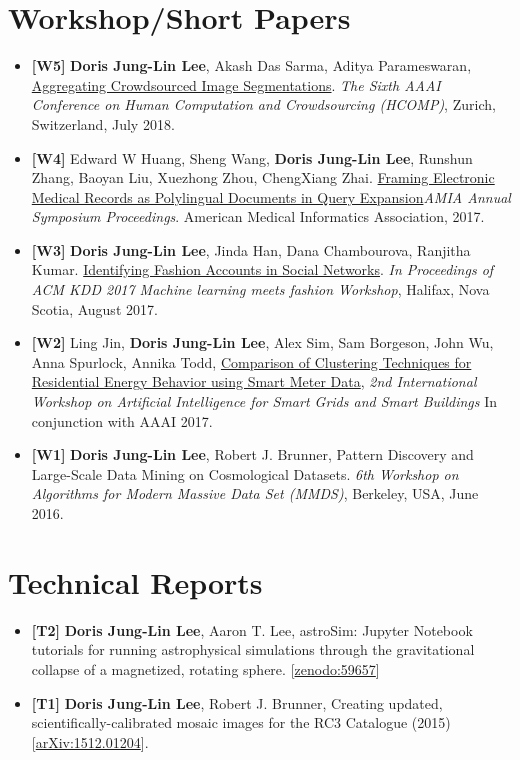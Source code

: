 \documentclass{res}
\begin{document}
\begin{resume}
\section{Workshop/Short Papers}
\begin{itemize}[leftmargin=0in,label={}]
\item \textbf{[W5]} \textbf{Doris Jung-Lin Lee}, Akash Das Sarma, Aditya Parameswaran, \href{http://ceur-ws.org/Vol-2173/paper10.pdf}{Aggregating Crowdsourced Image Segmentations}. \textit{The Sixth AAAI Conference on Human Computation and Crowdsourcing (HCOMP)}, Zurich, Switzerland, July 2018.
\item \textbf{[W4]} Edward W Huang, Sheng Wang, \textbf{Doris Jung-Lin Lee}, Runshun Zhang, Baoyan Liu, Xuezhong Zhou, ChengXiang Zhai. \href{https://amia2017.zerista.com/event/member/389402}{Framing Electronic Medical Records as Polylingual Documents in Query Expansion}\textit{AMIA Annual Symposium Proceedings}. American Medical Informatics Association, 2017.
\item \textbf{[W3]} \textbf{Doris Jung-Lin Lee}, Jinda Han, Dana Chambourova, Ranjitha Kumar. \href{https://kddfashion2017.mybluemix.net/final_submissions/ML4Fashion_paper_21.pdf}{Identifying Fashion Accounts in Social Networks}.  \textit{In Proceedings of ACM KDD 2017 Machine learning meets fashion Workshop}, Halifax, Nova Scotia, August 2017.
\item \textbf{[W2]} Ling Jin, \textbf{Doris Jung-Lin Lee}, Alex Sim, Sam Borgeson, John Wu, Anna Spurlock, Annika Todd, \href{https://aaai.org/ocs/index.php/WS/AAAIW17/paper/view/15166}{Comparison of Clustering Techniques for Residential Energy Behavior using Smart Meter Data}, \textit{2nd International Workshop on Artificial Intelligence for Smart Grids and Smart Buildings} In conjunction with AAAI 2017.
\item \textbf{[W1]} \textbf{Doris Jung-Lin Lee}, Robert J. Brunner, Pattern Discovery and Large-Scale Data Mining on Cosmological Datasets. \textit{6th Workshop on Algorithms for Modern Massive Data Set (MMDS)}, Berkeley, USA, June 2016.
\end{itemize}
\vspace{-10pt}
\section{Technical Reports}
\begin{itemize}[leftmargin=0in,label={}]
\item \textbf{[T2]} \textbf{Doris Jung-Lin Lee}, Aaron T. Lee, astroSim: Jupyter Notebook tutorials for running astrophysical simulations through the gravitational collapse of a magnetized, rotating sphere. [\href{http://doi.org/10.5281/zenodo.59657}{zenodo:59657}]
\item \textbf{[T1]}  \textbf{Doris Jung-Lin Lee}, Robert J. Brunner, Creating updated, scientifically-calibrated mosaic images for the RC3 Catalogue (2015) [\href{http://arxiv.org/abs/1512.01204}{arXiv:1512.01204}]. 
\end{itemize}
\vspace{-10pt}

\end{resume}
\end{document}
